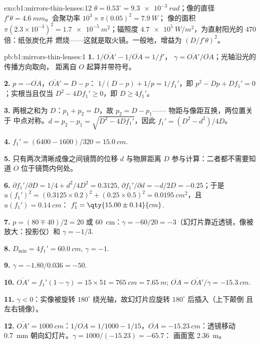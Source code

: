 \begin{solution}{exo:b1:mirrors-thin-lenses:12}
$\theta = 0.53^\circ = \qty{9.3e-3}{rad}$；像的直径 $f'\theta =
\qty{4.6}{mm}$。会聚功率 $10^3 \times \pi(0.05)^2 = \qty{7.9}{W}$；
像的面积 $\pi(2.3\times10^{-3})^2 = \qty{1.7e-5}{m^2}$；辐照度
$\qty{4.7e5}{W/m^2}$，为直射阳光的 $470$ 倍：纸张炭化并
燃烧——这就是取火镜。一般地，增益为
$(D/f'\theta)^2$。
\end{solution}

\begin{solution}{pb:b1:mirrors-thin-lenses:1}
\textbf{1.} $1/\overline{OA'} - 1/\overline{OA} = 1/f'$，
$\gamma = \overline{OA'}/\overline{OA}$；光轴沿光的传播方向取向，
距离自 $O$ 起算并带符号。

\textbf{2.} $p = -\overline{OA}$，$\overline{OA'} = D - p$：
$1/(D - p) + 1/p = 1/f_1'$，即 $p^2 - Dp + Df_1' = 0$；实根当且仅当
$D^2 - 4Df_1' \geq 0$，即 $D \geq 4f_1'$。

\textbf{3.} 两根之和为 $D$：$p_1 + p_2 = D$，故 $p_2 = D - p_1$——
物距与像距互换，两位置关于
中点对称。$d = p_2 - p_1 = \sqrt{D^2 - 4Df_1'}$，因此 $f_1' = (D^2 -
d^2)/4D$。

\textbf{4.} $f_1' = (6400 - 1600)/320 = \qty{15.0}{cm}$.

\textbf{5.} 只有两次清晰成像之间镜筒的位移 $d$
与物屏距离 $D$ 参与计算：二者都不需要知道
$O$ 位于镜筒内何处。

\textbf{6.} $\partial f_1'/\partial D = 1/4 + d^2/4D^2 = 0.3125$,
$\partial f_1'/\partial d = -d/2D = -0.25$；于是
$u(f_1')^2 = (0.3125 \times 0.2)^2 + (0.25 \times 0.5)^2 =
\qty{0.0195}{cm^2}$，且 $u(f_1') = \qty{0.14}{cm}$：
$f_1' = \qty{15.00\pm0.14}{cm}$.

\textbf{7.} $p = (80 \mp 40)/2 = 20$ 或 \qty{60}{cm}：$\gamma =
-60/20 = -3$（幻灯片靠近透镜，像被放大：投影仪）和
$\gamma = -1/3$.

\textbf{8.} $D_{\min} = 4f_1' = \qty{60.0}{cm}$, $\gamma = -1$.

\textbf{9.} $\gamma = -1.80/0.036 = -50$.

\textbf{10.} $\overline{OA'} = f_1'(1 - \gamma) = 15 \times 51 =
\qty{765}{cm} = \qty{7.65}{m}$; $\overline{OA} = \overline{OA'}/\gamma =
\qty{-15.3}{cm}$.

\textbf{11.} $\gamma < 0$：实像被旋转 $180^\circ$
绕光轴，故幻灯片应旋转 $180^\circ$ 后插入（上下颠倒
且左右镜像）。

\textbf{12.} $\overline{OA'} = \qty{1000}{cm}$：$1/\overline{OA} = 1/1000
- 1/15$，$\overline{OA} = \qty{-15.23}{cm}$：透镜移动 \qty{0.7}{mm}
朝向幻灯片。$\gamma = 1000/(-15.23) = -65.7$：
画面宽 \qty{2.36}{m}。


\end{solution}
